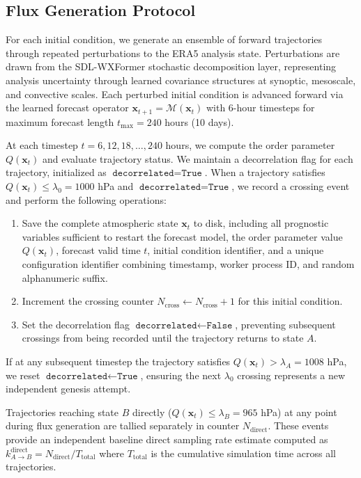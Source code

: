 \documentclass[11pt]{article}
\begin{document}
\subsection{Flux Generation Protocol}

For each initial condition, we generate an ensemble of forward trajectories through repeated perturbations to the ERA5 analysis state. Perturbations are drawn from the SDL-WXFormer stochastic decomposition layer, representing analysis uncertainty through learned covariance structures at synoptic, mesoscale, and convective scales. Each perturbed initial condition is advanced forward via the learned forecast operator $\mathbf{x}_{t+1} = \mathcal{M}(\mathbf{x}_t)$ with 6-hour timesteps for maximum forecast length $t_{\text{max}} = 240$ hours (10 days).

At each timestep $t = 6, 12, 18, \ldots, 240$ hours, we compute the order parameter $Q(\mathbf{x}_t)$ and evaluate trajectory status. We maintain a decorrelation flag for each trajectory, initialized as $\texttt{decorrelated} = \texttt{True}$. When a trajectory satisfies $Q(\mathbf{x}_t) \leq \lambda_0 = 1000$ hPa and $\texttt{decorrelated} = \texttt{True}$, we record a crossing event and perform the following operations:

\begin{enumerate}
    \item Save the complete atmospheric state $\mathbf{x}_t$ to disk, including all prognostic variables sufficient to restart the forecast model, the order parameter value $Q(\mathbf{x}_t)$, forecast valid time $t$, initial condition identifier, and a unique configuration identifier combining timestamp, worker process ID, and random alphanumeric suffix.
    
    \item Increment the crossing counter $N_{\text{cross}} \gets N_{\text{cross}} + 1$ for this initial condition.
    
    \item Set the decorrelation flag $\texttt{decorrelated} \gets \texttt{False}$, preventing subsequent crossings from being recorded until the trajectory returns to state $A$.
\end{enumerate}

If at any subsequent timestep the trajectory satisfies $Q(\mathbf{x}_t) > \lambda_A = 1008$ hPa, we reset $\texttt{decorrelated} \gets \texttt{True}$, ensuring the next $\lambda_0$ crossing represents a new independent genesis attempt.

Trajectories reaching state $B$ directly ($Q(\mathbf{x}_t) \leq \lambda_B = 965$ hPa) at any point during flux generation are tallied separately in counter $N_{\text{direct}}$. These events provide an independent baseline direct sampling rate estimate computed as $k_{A \to B}^{\text{direct}} = N_{\text{direct}}/T_{\text{total}}$ where $T_{\text{total}}$ is the cumulative simulation time across all trajectories.
\end{document}
